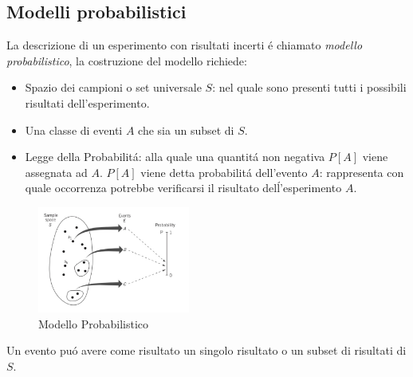     \subsection{Modelli probabilistici}
        La descrizione di un esperimento con risultati incerti é chiamato \emph{modello probabilistico}, la costruzione del modello richiede:
        \begin{itemize}
            \item {Spazio dei campioni o set universale $S$: nel quale sono presenti tutti i possibili risultati dell'esperimento.}
            \item {Una classe di eventi $A$ che sia un subset di $S$.}
            \item {Legge della Probabilitá: alla quale una quantitá non negativa $P[A]$ viene assegnata ad $A$. $P[A]$ viene detta probabilitá dell'evento $A$: rappresenta
                con quale occorrenza potrebbe verificarsi il risultato delĺ'esperimento $A$.}
        \end{itemize}
        \begin{figure}[H]
            \centering
            \includegraphics[width = 5cm]{media/Insieme_probabilita.png}
            \caption{Modello Probabilistico} 
        \end{figure}
        Un evento puó avere come risultato un singolo risultato o un subset di risultati di $S$.
